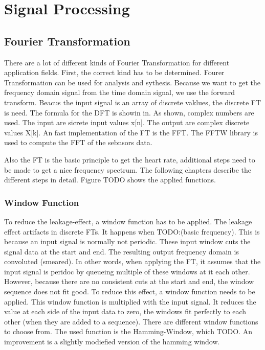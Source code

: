 \documentclass[oneside, notitlepage]{scrreprt}
\begin{document}
\section{Signal Processing}

\subsection{Fourier Transformation}
There are a lot of different kinds of Fourier Transformation for different application fields. First, the correct kind has to be determined.
Fourer Transformation can be used for analysis and sythesis. Because we want to get the frequency domain signal from the time domain signal,
we use the forward transform. Beacus the input signal is an array of discrete vaklues, the discrete FT is need. The formula for the DFT is showin in.
As shown, complex numbers are used. The input are sicrete input values x[n]. The output are complex discrete values X[k].
An fast implementation of the FT is the FFT. The FFTW library is used to compute the FFT of the sebnsors data.

Also the FT is the basic principle to get the heart rate, additional steps need to be made to get a nice frequency spectrum. The following chapters describe
the different steps in detail. Figure TODO shows the applied functions.

\subsubsection{Window Function}
To reduce the leakage-effect, a window function has to be applied. The leakage effect artifacts in discrete FTs. It happens when TODO:(basic frequency).
This is because an input signal is normally not periodic. These input window cuts the signal data at the start and end. The resulting output frequency
domain is convoluted (smeared). In other words, when applying the FT, it assumes that the input signal is peridoc by queueing multiple of these windows at it each other.
However, because there are no consistent cuts at the start and end, the window sequence does not fit good. To reduce this effect, a window function needs to be applied.
This window function is multiplied with the input signal. It reduces the value at each side of the input data to zero, the windows fit perfectly to each other
(when they are added to a sequence). There are different window functions to choose from. The used function is the Hamming-Window, which TODO.
An improvement is a slightly modiefied version of the hamming window.
\end{document}
